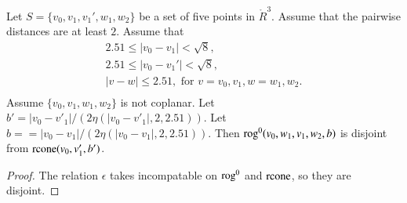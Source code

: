 \newpage


\begin{lemma}
Let $S=\{v_0,v_1,v_1',w_1,w_2\}$ be a set of five points in $\ring{R}^3$.
Assume that the pairwise distances are at least $2$.  Assume
that
  $$\begin{array}{lll}
  2.51 \le |v_0-v_1| < \sqrt8,\\
  2.51\le |v_0-v_1'| < \sqrt8,\\
  |v-w|\le 2.51, \text{ for } v=v_0,v_1, w=w_1,w_2.\\
  \end{array}
  $$
Assume $\{v_0,v_1,w_1,w_2\}$ is not coplanar.  
Let $b' = |v_0-v'_1|/(2\eta(|v_0-v'_1|,2,2.51))$.  
Let $b== |v_0-v_1|/(2\eta(|v_0-v_1|,2,2.51))$.  
Then
${\operatorname{rog}}^0(v_0,w_1,v_1,w_2,b)$ is disjoint from ${\operatorname{rcone}}(v_0,v_1',b')$.
\end{lemma}


\begin{proof} The relation $\epsilon$ takes incompatable on
${\operatorname{rog}}^0$ and ${\operatorname{rcone}}$, so they are disjoint.
\end{proof}

\newpage


